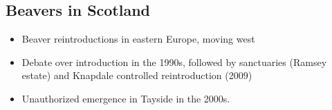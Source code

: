 \subsection{Beavers in Scotland}

\begin{itemize}
    \item Beaver reintroductions in eastern Europe, moving west
    \item Debate over introduction in the 1990s, followed by sanctuaries (Ramsey estate) and Knapdale controlled reintroduction (2009)
    \item Unauthorized emergence in Tayside in the 2000s.
\end{itemize}
